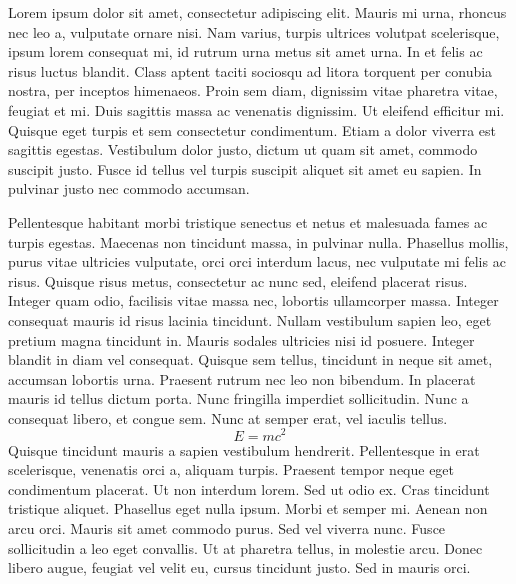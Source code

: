 \documentclass[11pt]{article}
\begin{document}
Lorem ipsum dolor sit amet, consectetur adipiscing elit. Mauris mi urna,
rhoncus nec leo a, vulputate ornare nisi. Nam varius, turpis ultrices
volutpat scelerisque, ipsum lorem consequat mi, id rutrum urna metus sit
amet urna. In et felis ac risus luctus blandit. Class aptent taciti
sociosqu ad litora torquent per conubia nostra, per inceptos himenaeos.
Proin sem diam, dignissim vitae pharetra vitae, feugiat et mi. Duis
sagittis massa ac venenatis dignissim. Ut eleifend efficitur mi. Quisque
eget turpis et sem consectetur condimentum. Etiam a dolor viverra est
sagittis egestas. Vestibulum dolor justo, dictum ut quam sit amet,
commodo suscipit justo. Fusce id tellus vel turpis suscipit aliquet sit
amet eu sapien. In pulvinar justo nec commodo accumsan.

Pellentesque habitant morbi tristique senectus et netus et malesuada fames ac
turpis egestas. Maecenas non tincidunt massa, in pulvinar nulla. Phasellus
mollis, purus vitae ultricies vulputate, orci orci interdum lacus, nec
vulputate mi felis ac risus. Quisque risus metus, consectetur ac nunc sed,
eleifend placerat risus. Integer quam odio, facilisis vitae massa nec, lobortis
ullamcorper massa. Integer consequat mauris id risus lacinia tincidunt. Nullam
vestibulum sapien leo, eget pretium magna tincidunt in. Mauris sodales
ultricies nisi id posuere. Integer blandit in diam vel consequat. Quisque sem
tellus, tincidunt in neque sit amet, accumsan lobortis urna. Praesent rutrum
nec leo non bibendum. In placerat mauris id tellus dictum porta. Nunc fringilla
imperdiet sollicitudin. Nunc a consequat libero, et congue sem. Nunc at semper
erat, vel iaculis tellus.
\begin{equation*}
    E=mc^{2}
\end{equation*}
Quisque tincidunt mauris a sapien vestibulum hendrerit. Pellentesque in erat
scelerisque, venenatis orci a, aliquam turpis. Praesent tempor neque eget
condimentum placerat. Ut non interdum lorem. Sed ut odio ex. Cras tincidunt
tristique aliquet. Phasellus eget nulla ipsum. Morbi et semper mi. Aenean non
arcu orci. Mauris sit amet commodo purus. Sed vel viverra nunc. Fusce
sollicitudin a leo eget convallis. Ut at pharetra tellus, in molestie arcu.
Donec libero augue, feugiat vel velit eu, cursus tincidunt justo. Sed in mauris
orci.
\end{document}
